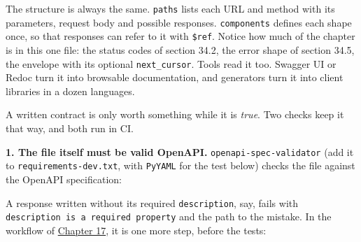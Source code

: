 \noindent{}The structure is always the same. \texttt{paths} lists each URL and method with its parameters, request body and possible responses. \texttt{components} defines each shape once, so that responses can refer to it with \texttt{\$ref}. Notice how much of the chapter is in this one file: the status codes of section 34.2, the error shape of section 34.5, the envelope with its optional \texttt{next\_cursor}. Tools read it too. Swagger UI or Redoc turn it into browsable documentation, and generators turn it into client libraries in a dozen languages.

A written contract is only worth something while it is \emph{true}. Two checks keep it that way, and both run in CI.

\textbf{1. The file itself must be valid OpenAPI.} \texttt{openapi-spec-validator} (add it to \texttt{requirements-dev.txt}, with \texttt{PyYAML} for the test below) checks the file against the OpenAPI specification:

\begin{codebox}[short]

\begin{Shaded}
\begin{Highlighting}[]
\ExtensionTok{$}
\end{Highlighting}
\end{Shaded}

\end{codebox}

\noindent{}A response written without its required \texttt{description}, say, fails with \texttt{\textquotesingle{}description\textquotesingle{}\ is\ a\ required\ property} and the path to the mistake. In the workflow of \hyperref[ch:17-build-process]{Chapter 17}, it is one more step, before the tests:

\begin{codebox}[short]

\begin{Shaded}
\begin{Highlighting}[]
\AttributeTok{      }\KeywordTok{{-}}\AttributeTok{ }\KeywordTok{:}
\AttributeTok{        }\KeywordTok{:}
\end{Highlighting}
\end{Shaded}

\end{codebox}

